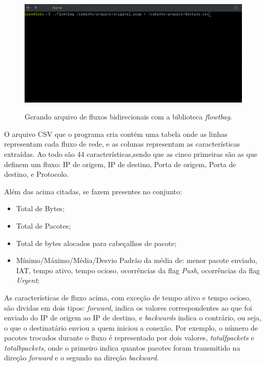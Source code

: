 \begin{figure}[h]
\caption{\small Gerando arquivo de fluxos bidirecionais com a biblioteca \textit{flowtbag}.}
\centering
\includegraphics[scale=0.50]{figs/exemplo-flowtbag.png}
\label{f.exemplo-flowtbag}
\end{figure}

O arquivo CSV que o programa cria contém uma tabela onde as linhas representam cada fluxo de rede, e as colunas representam as características extraídas. Ao todo são 44 características,sendo que as cinco primeiras são as que definem um fluxo: IP de origem, IP de destino, Porta de origem, Porta de destino, e Protocolo.

Além das acima citadas, se fazem presentes no conjunto:

\begin{itemize}
    \item Total de Bytes;
    \item Total de Pacotes;
    \item Total de bytes alocados para cabeçalhos de pacote;
    \item Mínimo/Máximo/Média/Desvio Padrão da média de: menor pacote enviado, IAT, tempo ativo, tempo ocioso, ocorrências da flag \textit{Push}, ocorrências da flag \textit{Urgent};
\end{itemize}

As características de fluxo acima, com exceção de tempo ativo e tempo ocioso, são dividas em dois tipos: \textit{forward}, indica os valores correspondentes ao que foi enviado do IP de origem ao IP de destino, e \textit{backwards} indica o contrário, ou seja, o que o destinatário enviou a quem iniciou a conexão. Por exemplo, o número de pacotes trocados durante o fluxo é representado por dois valores, \textit{totalfpackets} e \textit{totalbpackets}, onde o primeiro indica quantos pacotes foram transmitido na direção \textit{forward} e o segundo na direção \textit{backward}. 

